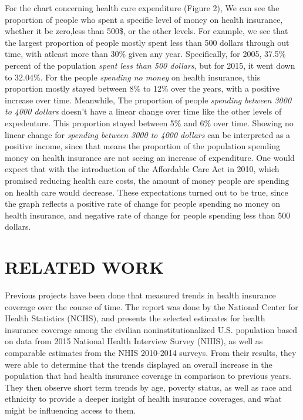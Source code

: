 \documentclass[10pt,]{article}
\begin{document}
For the chart concerning health care expenditure (Figure 2), We can see
the proportion of people who spent a specific level of money on health
insurance, whether it be zero,less than 500\$, or the other levels. For
example, we see that the largest proportion of people mostly spent less
than 500 dollars through out time, with atleast more than 30\% given any
year. Specifically, for 2005, 37.5\% percent of the population
\emph{spent less than 500 dollars}, but for 2015, it went down to
32.04\%. For the people \emph{spending no money} on health insurance,
this proportion mostly stayed between 8\% to 12\% over the years, with a
positive increase over time. Meanwhile, The proportion of people
\emph{spending between 3000 to 4000 dollars} doesn't have a linear
change over time like the other levels of expedenture. This proportion
stayed between 5\% and 6\% over time. Showing no linear change for
\emph{spending between 3000 to 4000 dollars} can be interpreted as a
positive income, since that means the proportion of the population
spending money on health insurance are not seeing an increase of
expenditure. One would expect that with the introduction of the
Affordable Care Act in 2010, which promised reducing health care costs,
the amount of money people are spending on health care would decrease.
These expectations turned out to be true, since the graph reflects a
positive rate of change for people spending no money on health
insurance, and negative rate of change for people spending less than 500
dollars.

\section{RELATED WORK}\label{related-work}

Previous projects have been done that measured trends in health
insurance coverage over the course of time. The report was done by the
National Center for Health Statistics (NCHS), and presents the selected
estimates for health insurance coverage among the civilian
noninstitutionalized U.S. population based on data from 2015 National
Health Interview Survey (NHIS), as well as comparable estimates from the
NHIS 2010-2014 surveys. From their results, they were able to determine
that the trends displayed an overall increase in the population that had
health insurance coverage in comparison to previous years. They then
observe short term trends by age, poverty status, as well as race and
ethnicity to provide a deeper insight of health insurance coverages, and
what might be influencing access to them.
\end{document}
